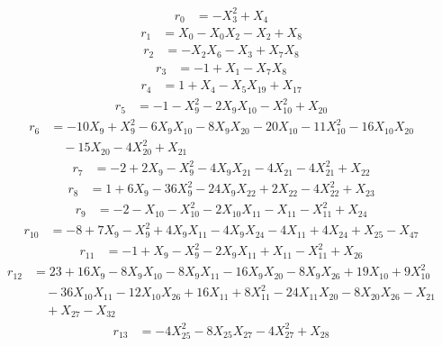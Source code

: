 \begingroup
\fontsize{9}{11}\selectfont
\setlength{\abovedisplayskip}{5pt}
\setlength{\belowdisplayskip}{5pt}
\begin{align*}
r_{0}&=-X_{3}^{2}+X_{4}
\end{align*}
\begin{align*}
r_{1}&=X_{0}-X_{0}X_{2}-X_{2}+X_{8}
\end{align*}
\begin{align*}
r_{2}&=-X_{2}X_{6}-X_{3}+X_{7}X_{8}
\end{align*}
\begin{align*}
r_{3}&=-1+X_{1}-X_{7}X_{8}
\end{align*}
\begin{align*}
r_{4}&=1+X_{4}-X_{5}X_{19}+X_{17}
\end{align*}
\begin{align*}
r_{5}&=-1-X_{9}^{2}-2X_{9}X_{10}-X_{10}^{2}+X_{20}
\end{align*}
\begin{align*}
r_{6}&=-10X_{9}+X_{9}^{2}-6X_{9}X_{10}-8X_{9}X_{20}-20X_{10}-11X_{10}^{2}-16X_{10}X_{20}\\
&\quad -15X_{20}-4X_{20}^{2}+X_{21}
\end{align*}
\begin{align*}
r_{7}&=-2+2X_{9}-X_{9}^{2}-4X_{9}X_{21}-4X_{21}-4X_{21}^{2}+X_{22}
\end{align*}
\begin{align*}
r_{8}&=1+6X_{9}-36X_{9}^{2}-24X_{9}X_{22}+2X_{22}-4X_{22}^{2}+X_{23}
\end{align*}
\begin{align*}
r_{9}&=-2-X_{10}-X_{10}^{2}-2X_{10}X_{11}-X_{11}-X_{11}^{2}+X_{24}
\end{align*}
\begin{align*}
r_{10}&=-8+7X_{9}-X_{9}^{2}+4X_{9}X_{11}-4X_{9}X_{24}-4X_{11}+4X_{24}+X_{25}-X_{47}
\end{align*}
\begin{align*}
r_{11}&=-1+X_{9}-X_{9}^{2}-2X_{9}X_{11}+X_{11}-X_{11}^{2}+X_{26}
\end{align*}
\begin{align*}
r_{12}&=23+16X_{9}-8X_{9}X_{10}-8X_{9}X_{11}-16X_{9}X_{20}-8X_{9}X_{26}+19X_{10}+9X_{10}^{2}\\
&\quad -36X_{10}X_{11}-12X_{10}X_{26}+16X_{11}+8X_{11}^{2}-24X_{11}X_{20}-8X_{20}X_{26}-X_{21}\\
&\quad +X_{27}-X_{32}
\end{align*}
\begin{align*}
r_{13}&=-4X_{25}^{2}-8X_{25}X_{27}-4X_{27}^{2}+X_{28}
\end{align*}
